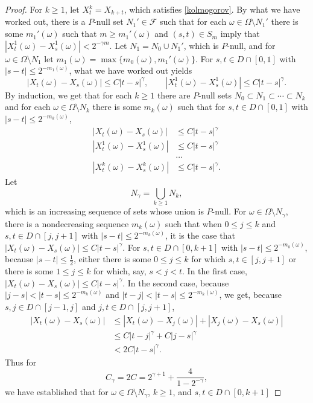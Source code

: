 \documentclass{article}
\theoremstyle{definition}
\theoremstyle{definition}
\begin{document}
\begin{proof}
For $k \geq 1$, let $X^k_t=X_{k+t}$, which satisfies \eqref{kolmogorov}. 
By what we have worked out, 
there is a $P$-null set $N_1' \in \mathscr{F}$ such that for each
$\omega \in \Omega \setminus N_1'$ there is some $m_1'(\omega)$ such that
$m \geq m_1'(\omega)$ and $(s,t) \in S_m$ imply that $|X^1_t(\omega)-X^1_s(\omega)|
<2^{-\gamma m}$. 
Let $N_1=N_0 \cup N_1'$, which is $P$-null, and for
$\omega \in \Omega \setminus N_1$ let $m_1(\omega)=\max\{m_0(\omega),m_1'(\omega)\}$. 
For $s,t \in D \cap [0,1]$ with $|s-t| \leq 2^{-m_1(\omega)}$, what we have worked out yields
\[
|X_t(\omega)-X_s(\omega)| \leq C|t-s|^\gamma, \qquad 
|X^1_t(\omega)-X^1_s(\omega)| \leq C|t-s|^\gamma.
\]
By induction, we get that for each $k \geq 1$ there are $P$-null sets $N_0 \subset N_1 \subset \cdots \subset N_k$ and for
each $\omega \in \Omega \setminus N_k$ there is some $m_k(\omega)$ such that
for $s,t \in D \cap [0,1]$ with $|s-t| \leq 2^{-m_k(\omega)}$,
\begin{align*}
|X_t(\omega)-X_s(\omega)| &\leq C|t-s|^\gamma\\
|X^1_t(\omega)-X^1_s(\omega)|&\leq C|t-s|^\gamma\\
&\ldots\\
|X^k_t(\omega)-X^k_s(\omega)|&\leq C|t-s|^\gamma.
\end{align*}
Let
\[
N_\gamma=\bigcup_{k \geq 1} N_k,
\]
 which is an increasing sequence of sets whose union is $P$-null. For $\omega \in \Omega \setminus N_\gamma$,
there is a nondecreasing sequence $m_k(\omega)$ such that when
$0 \leq j \leq k$ and  $s,t \in D \cap [j,j+1]$ with
$|s-t| \leq 2^{-m_k(\omega)}$, it is the case that $|X_t(\omega)-X_s(\omega)| \leq C|t-s|^\gamma$. 
For $s,t \in D \cap [0,k+1]$ with $|s-t| \leq 2^{-m_k(\omega)}$, 
because $|s-t| \leq \frac{1}{2}$, either there is some $0 \leq j \leq k$ for which 
$s,t \in [j,j+1]$ or there is some $1 \leq j \leq k$ for which, say, $s<j<t$. In the first case,
$|X_t(\omega)-X_s(\omega)| \leq C|t-s|^\gamma$.  In the second case, 
because $|j-s|<|t-s| \leq 2^{-m_k(\omega)}$ and $|t-j| < |t-s| \leq 2^{-m_k(\omega)}$, we get, because $s,j \in D \cap [j-1,j]$
and
$j,t \in D \cap [j,j+1]$,
\begin{align*}
|X_t(\omega)-X_s(\omega)|&\leq |X_t(\omega)-X_j(\omega)| + |X_j(\omega)-X_s(\omega)|\\
&\leq C|t-j|^\gamma+C|j-s|^\gamma\\
&< 2C|t-s|^\gamma. 
\end{align*}
Thus for
\[
C_\gamma=2C =  2^{\gamma+1}+\frac{4}{1-2^{-\gamma}},
\]
we have established that for $\omega \in \Omega \setminus N_\gamma$, $k \geq 1$, and $s,t \in D \cap [0,k+1]$

\end{proof}
\end{document}
